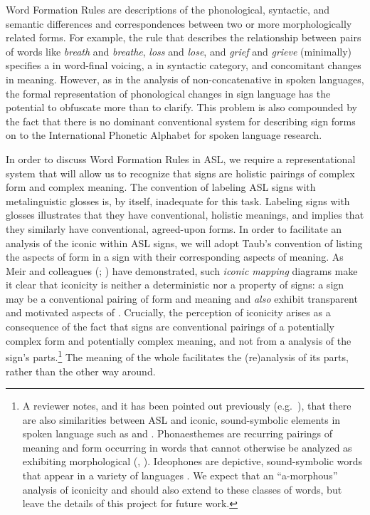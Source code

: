 \documentclass[output=paper,
modfonts
]{LSP/langsci}
\begin{document}
Word Formation Rules are descriptions of the phonological,  syntactic, and semantic differences and correspondences between two or more morphologically related forms. For example, the rule that describes the relationship between pairs of  words like \textit{breath} and \textit{breathe}, \textit{loss} and \textit{lose}, and \textit{grief} and \textit{grieve} (minimally) specifies a  in word-final voicing, a  in syntactic category, and concomitant changes in meaning. However, as in the analysis of non-concatenative  in spoken languages, the formal representation of phonological  changes in sign language  has the potential to obfuscate more than to clarify. This problem is also compounded by the fact that there is no dominant conventional system for describing sign forms on  to the International Phonetic Alphabet for spoken language research.

  In order to discuss Word Formation Rules in ASL, we require a representational system that will allow us to recognize that signs are holistic pairings of complex form and complex meaning. The convention of labeling ASL signs with  metalinguistic glosses is, by itself, inadequate for this task. Labeling signs with  glosses illustrates that they have conventional, holistic meanings, and implies that they similarly have conventional, agreed-upon forms. In order to facilitate an analysis of the iconic  within ASL signs, we will adopt Taub's \citeyearpar{Taub2001} convention of listing the aspects of form in a sign with their corresponding aspects of meaning. As Meir and colleagues (\citealt[874]{Meir2010}; \citealt[316]{Meir2013}) have demonstrated, such \textit{iconic mapping} diagrams make it clear that iconicity is neither a deterministic nor a  property of signs: a sign may be a conventional pairing of form and meaning and \textit{also} exhibit transparent and motivated aspects of . Crucially, the perception of iconicity arises as a consequence of the fact that signs are conventional pairings of a potentially complex form and potentially complex meaning, and not from a  analysis of the sign's parts.\footnote{A reviewer notes, and it has been pointed out previously (e.g.\ \citealt{Fernald2000}), that there are also similarities between ASL  and iconic, sound-symbolic elements in spoken language such as  and . Phonaesthemes are recurring pairings of meaning and form occurring in words that cannot otherwise be analyzed as exhibiting  morphological  (\citealt[49]{anderson1992}, \citealt{Bergen2004}). Ideophones are depictive, sound-symbolic words that appear in a variety of languages \citep{Dingemanse2012}. We expect that an ``a-morphous'' analysis of iconicity and  should also extend to these classes of words, but leave the details of this project for future work.} The meaning of the whole facilitates the (re)analysis of its parts, rather than the other way around.
\end{document}
